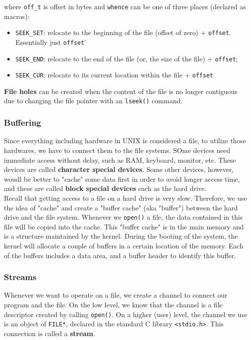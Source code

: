 \documentclass{article}
\newcommand{\bold}[1]{\textbf{#1}}
\renewcommand{\b}{\item[$\circ$]}
\newcommand{\newlist}{\begin{itemize}}
\renewcommand{\endlist}{\end{itemize}}
\newcommand{\code}[1]{\texttt{#1}}
\begin{document}
\noindent where \code{off\_t} is offset in bytes and \code{whence} can be one of three places (declared as macros):

\newlist
\b \code{SEEK\_SET}: relocate to the beginning of the file (offset of zero) + \code{offset}. Essentially just \code{offset}'
\b \code{SEEK\_END}: relocate to the end of the file (or, the size of the file) + \code{offset};
\b \code{SEEK\_CUR}: relocate to its current location within the file + \code{offset}
\endlist

\noindent \bold{File holes} can be created when the content of the file is no longer contiguous due to changing the file pointer with an \code{lseek()} command. 

\subsubsection{Buffering}

Since everything including hardware in UNIX is considered a file, to utilize those hardwares, we have to connect them to the file systems. SOme devices need immediate access without delay, such as RAM, keyboard, monitor, etc. These devices are called \bold{character special devices}. Some other devices, however, woudl be better to "cache" some data first in order to avoid longer access time, and these are called \bold{block special devices} such as the hard drive. \\

\noindent Recall that getting access to a file on a hard drive is very slow. Therefore, we use the idea of "cache" and create a "buffer cache" (aka "buffer") between the hard drive and the file system. Whenever we \code{open()} a file, the data contained in this file will be copied into the cache. This "buffer cache" is in the main memory and is a structure maintained by the kernel. During the booting of the system, the kernel will allocate a couple of buffers in a certain location of the memory. Each of the buffers includes a data area, and a buffer header to identify this buffer. 

\subsubsection{Streams}

Whenever we want to operate on a file, we create a channel to connect our program and the file. On the low level, we know that the channel is a file descriptor created by calling \code{open()}. On a higher (user) level, the channel we use is an object of \code{FILE*}, declared in the standard C library \code{<stdio.h>}. This connection is called a \bold{stream}. \\ 
\end{document}
